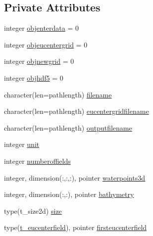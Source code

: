 \subsection*{Private Attributes}
\begin{DoxyCompactItemize}
\item 
integer \mbox{\hyperlink{structmoduleeucenterformat_1_1t__eucenterformat_ad00d03fec28355cbc3f286fabf0e4dca}{objenterdata}} = 0
\item 
integer \mbox{\hyperlink{structmoduleeucenterformat_1_1t__eucenterformat_a9facddb115a0c8f2a3e42dd02e385592}{objeucentergrid}} = 0
\item 
integer \mbox{\hyperlink{structmoduleeucenterformat_1_1t__eucenterformat_a9b8c3a07da1fb4c665187a9d3685c189}{objnewgrid}} = 0
\item 
integer \mbox{\hyperlink{structmoduleeucenterformat_1_1t__eucenterformat_adbd880f02916514245ab7fb1527d19f6}{objhdf5}} = 0
\item 
character(len=pathlength) \mbox{\hyperlink{structmoduleeucenterformat_1_1t__eucenterformat_af2d94e3d9608efbb231286d100ae6679}{filename}}
\item 
character(len=pathlength) \mbox{\hyperlink{structmoduleeucenterformat_1_1t__eucenterformat_abb2e8db9295a403f35b5db89f1672471}{eucentergridfilename}}
\item 
character(len=pathlength) \mbox{\hyperlink{structmoduleeucenterformat_1_1t__eucenterformat_a05e7e9a600edd426be1f33e987c4dc01}{outputfilename}}
\item 
integer \mbox{\hyperlink{structmoduleeucenterformat_1_1t__eucenterformat_adfab95fcf2d7acff8dc8d66f7804f9e5}{unit}}
\item 
integer \mbox{\hyperlink{structmoduleeucenterformat_1_1t__eucenterformat_aed8268cc699f4d884dbdcd6249afadc4}{numberoffields}}
\item 
integer, dimension(\+:,\+:,\+:), pointer \mbox{\hyperlink{structmoduleeucenterformat_1_1t__eucenterformat_a10247bd815c3c6717e5d472c3609984b}{waterpoints3d}}
\item 
integer, dimension(\+:,\+:), pointer \mbox{\hyperlink{structmoduleeucenterformat_1_1t__eucenterformat_a80b09f2013e6858028aeac85fae7a298}{bathymetry}}
\item 
type(t\+\_\+size2d) \mbox{\hyperlink{structmoduleeucenterformat_1_1t__eucenterformat_a4edd1a70fda104b37ce17eededdd53ec}{size}}
\item 
type(\mbox{\hyperlink{structmoduleeucenterformat_1_1t__eucenterfield}{t\+\_\+eucenterfield}}), pointer \mbox{\hyperlink{structmoduleeucenterformat_1_1t__eucenterformat_a1f1d648833f76db08b62f411082c3e84}{firsteucenterfield}}
\end{DoxyCompactItemize}


